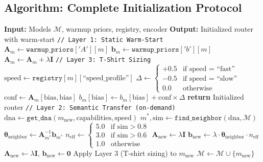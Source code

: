 \documentclass[sigconf]{acmart}
\begin{document}
\subsection{Algorithm: Complete Initialization Protocol}

\begin{algorithm}[t]
\caption{Three-Layer Initialization Protocol}
\label{alg:initialization}
\begin{algorithmic}[1]
\STATE \textbf{Input:} Models $\mathcal{M}$, warmup priors, registry, encoder
\STATE \textbf{Output:} Initialized router with warm-start
\STATE
\STATE \texttt{// Layer 1: Static Warm-Start}
    \STATE $\mathbf{A}_m \leftarrow \texttt{warmup\_priors}['A'][m]$
    \STATE $\mathbf{b}_m \leftarrow \texttt{warmup\_priors}['b'][m]$
    \STATE $\mathbf{A}_m \leftarrow \mathbf{A}_m + \lambda \mathbf{I}$ 
\ENDFOR
\STATE
\STATE \texttt{// Layer 3: T-Shirt Sizing}
    \STATE $\text{speed} \leftarrow \texttt{registry}[m][\text{``speed\_profile''}]$
    \STATE $\Delta \leftarrow \begin{cases} +0.5 & \text{if speed = ``fast''} \\ -0.5 & \text{if speed = ``slow''} \\ 0.0 & \text{otherwise} \end{cases}$
    \STATE $\text{conf} \leftarrow \mathbf{A}_m[\text{bias}, \text{bias}]$
    \STATE $b_m[\text{bias}] \leftarrow b_m[\text{bias}] + \text{conf} \times \Delta$
\ENDFOR
\STATE
\STATE \textbf{return} Initialized router
\STATE
\STATE \texttt{// Layer 2: Semantic Transfer (on-demand)}
    \STATE $\text{dna} \leftarrow \texttt{get\_dna}(m_{\text{new}}, \text{capabilities}, \text{speed})$
    \STATE $m^*, \text{sim} \leftarrow \texttt{find\_neighbor}(\text{dna}, \mathcal{M})$
        \STATE $\boldsymbol{\theta}_{\text{neighbor}} \leftarrow \mathbf{A}_{m^*}^{-1} \mathbf{b}_{m^*}$
        \STATE $n_{\text{eff}} \leftarrow \begin{cases} 5.0 & \text{if sim} > 0.8 \\ 3.0 & \text{if sim} > 0.6 \\ 1.0 & \text{otherwise} \end{cases}$
        \STATE $\mathbf{A}_{\text{new}} \leftarrow \lambda \mathbf{I}$ 
        \STATE $\mathbf{b}_{\text{new}} \leftarrow \lambda \cdot \boldsymbol{\theta}_{\text{neighbor}} \cdot n_{\text{eff}}$ 
    \ELSE
        \STATE $\mathbf{A}_{\text{new}} \leftarrow \lambda \mathbf{I}$, $\mathbf{b}_{\text{new}} \leftarrow \mathbf{0}$ 
    \ENDIF
    \STATE Apply Layer 3 (T-shirt sizing) to $m_{\text{new}}$
    \STATE $\mathcal{M} \leftarrow \mathcal{M} \cup \{m_{\text{new}}\}$
\ENDFUNCTION
\end{algorithmic}
\end{algorithm}
\end{document}
